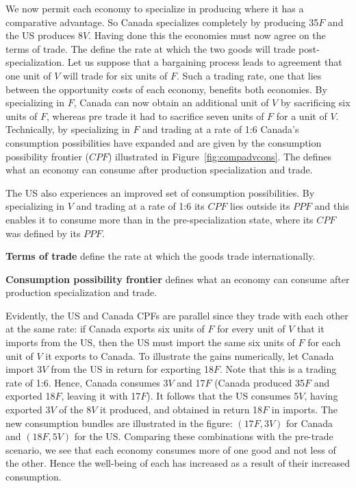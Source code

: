 We now permit each economy to specialize in producing where it has a comparative advantage. So Canada specializes completely by producing 35$F$ and the US produces 8$V$. Having done this the economies must now agree on the terms of trade. The  define the rate at which the two goods will trade post-specialization. Let us suppose that a bargaining process leads to agreement that one unit of $V$ will trade for six units of $F$. Such a trading rate, one that lies between the opportunity costs of each economy, benefits both economies. By specializing in $F$, Canada can now obtain an additional unit of $V$ by sacrificing six units of $F$, whereas pre trade it had to sacrifice seven units of $F$ for a unit of $V$. Technically, by specializing in $F$ and trading at a rate of 1:6 Canada's consumption possibilities have expanded and are given by the consumption possibility frontier ($CPF$) illustrated in Figure~\ref{fig:compadvcons}. The  defines what an economy can consume after production specialization and trade.



The US also experiences an improved set of consumption possibilities. By specializing in $V$ and trading at a rate of 1:6 its $CPF$ lies outside its $PPF$ and this enables it to consume more than in the pre-specialization state, where its $CPF$ was defined by its $PPF$. 

\begin{DefBox}
\textbf{Terms of trade} define the rate at which the goods trade internationally.

\textbf{Consumption possibility frontier} defines what an economy can consume after production specialization and trade.
\end{DefBox}

Evidently, the US and Canada CPFs are parallel since they trade with each other at the same rate: if Canada exports six units of $F$ for every unit of $V$ that it imports from the US, then the US must import the same six units of $F$ for each unit of $V$ it exports to Canada. To illustrate the gains numerically, let Canada import 3$V$ from the US in return for exporting 18$F$. Note that this is a trading rate of 1:6. Hence, Canada consumes 3$V$ and 17$F$ (Canada produced 35$F$ and exported 18$F$, leaving it with 17$F$). It follows that the US consumes 5$V$, having exported 3$V$ of the 8$V$ it produced, and obtained in return 18$F$ in imports. The new consumption bundles are illustrated in the figure: $(17F,3V)$ for Canada and $(18F,5V)$ for the US. Comparing these combinations with the pre-trade scenario, we see that each economy consumes more of one good and not less of the other. Hence the well-being of each has increased as a result of their increased consumption.

